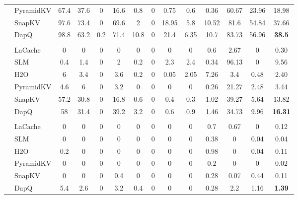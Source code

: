 \begin{table}[t]
{\begin{tabular}{>{\bfseries}c >{\raggedright}p{2.2cm} *{12}{c}}
& PyramidKV & 67.4 & 37.6 & 0 & 16.6 & 0.8 & 0 & 0.75 & 0.6 & 0.36 & 60.67 & 23.96 & 18.98 \\
& SnapKV & 97.6 & 73.4 & 0 & 69.6 & 2 & 0 & 18.95 & 5.8 & 10.52 & 81.6 & 54.84 & 37.66 \\
& DapQ & 98.8 & 63.2 & 0.2 & 71.4 & 10.8 & 0 & 21.4 & 6.35 & 10.7 & 83.73 & 56.96 & \textbf{38.5} \\
& \multicolumn{13}{c}{\cellcolor{gray!20}\textbf{KV Cache Size = 128}} \\
& LaCache & 0 & 0 & 0 & 0 & 0 & 0 & 0 & 0 & 0.6 & 2.67 & 0 & 0.30 \\
& SLM & 0.4 & 1.4 & 0 & 2 & 0.2 & 0 & 2.3 & 2.4 & 0.34 & 96.13 & 0 & 9.56 \\
& H2O & 6 & 3.4 & 0 & 3.6 & 0.2 & 0 & 0.05 & 2.05 & 7.26 & 3.4 & 0.48 & 2.40 \\
& PyramidKV & 4.6 & 6 & 0 & 3.2 & 0 & 0 & 0 & 0 & 0.26 & 21.27 & 2.48 & 3.44 \\
& SnapKV & 57.2 & 30.8 & 0 & 16.8 & 0.6 & 0 & 0.4 & 0.3 & 1.02 & 39.27 & 5.64 & 13.82 \\
& DapQ & 58 & 31.4 & 0 & 39.2 & 3.2 & 0 & 0.6 & 0.9 & 1.46 & 34.73 & 9.96 & \textbf{16.31} \\
& \multicolumn{13}{c}{\cellcolor{gray!20}\textbf{KV Cache Size = 64}} \\
& LaCache & 0 & 0 & 0 & 0 & 0 & 0 & 0 & 0 & 0.7 & 0.67 & 0 & 0.12 \\
& SLM & 0 & 0 & 0 & 0 & 0 & 0 & 0 & 0 & 0.38 & 0 & 0.04 & 0.04 \\
& H2O & 0.2 & 0 & 0 & 0 & 0 & 0 & 0 & 0 & 0.98 & 0 & 0.04 & 0.11 \\
& PyramidKV & 0 & 0 & 0 & 0 & 0 & 0 & 0 & 0 & 0.2 & 0 & 0 & 0.02 \\
& SnapKV & 0 & 0 & 0 & 0.4 & 0 & 0 & 0 & 0 & 0.28 & 0.07 & 0.44 & 0.11 \\
& DapQ & 5.4 & 2.6 & 0 & 3.2 & 0.4 & 0 & 0 & 0 & 0.28 & 2.2 & 1.16 & \textbf{1.39} \\
\bottomrule
\end{tabular}
}

\label{table:ruler_qwen25}
\end{table}

\clearpage

